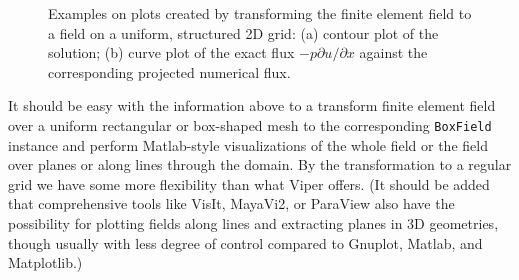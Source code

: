 \begin{figure}
  \begin{center}
    \centerline{
      }
    \centerline{
    }
    \caption{  Examples on plots created by transforming the finite element field to
      a field on a uniform, structured 2D grid:
      (a) contour plot of the solution; (b) curve plot of the exact flux
      $-p\partial u/\partial x$ against the corresponding projected numerical flux.
    }
    \label{langtangen:poisson:2D:fig2}
  \end{center}
\end{figure}

It should be easy with the information above to a transform finite element
field over a uniform rectangular or box-shaped mesh to the corresponding
{\fontsize{12pt}{12pt}\texttt{BoxField}} instance and perform Matlab-style
visualizations of the whole field or
the field over planes or along lines through the domain.
By the transformation to a regular grid we have some more flexibility
than what Viper offers. (It should be added that
comprehensive tools like
VisIt, MayaVi2, or ParaView also have the possibility for plotting fields
along lines and extracting planes in 3D geometries, though usually with
less degree of control compared to Gnuplot, Matlab, and Matplotlib.)

